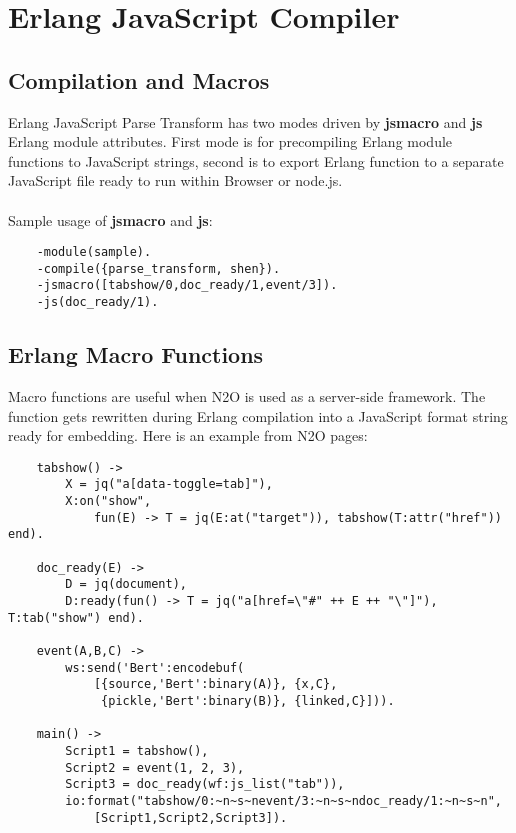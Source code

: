 \section{Erlang JavaScript Compiler}

\subsection{Compilation and Macros}
Erlang JavaScript Parse Transform has two modes driven
by {\bf \-jsmacro} and {\bf \-js} Erlang module attributes.
First mode is for precompiling Erlang module functions
to JavaScript strings, second is to export Erlang function
to a separate JavaScript file ready to run within Browser or node.js.

\paragraph{}
Sample usage of {\bf \-jsmacro} and {\bf \-js}:

\vspace{1\baselineskip}
\begin{lstlisting}
    -module(sample).
    -compile({parse_transform, shen}).
    -jsmacro([tabshow/0,doc_ready/1,event/3]).
    -js(doc_ready/1).
\end{lstlisting}

\subsection{Erlang Macro Functions}
Macro functions are useful when N2O is used as a server-side framework.
The function gets rewritten during Erlang compilation into a JavaScript format
string ready for embedding. Here is an example from N2O pages:

\begin{lstlisting}
    tabshow() ->
        X = jq("a[data-toggle=tab]"),
        X:on("show", 
            fun(E) -> T = jq(E:at("target")), tabshow(T:attr("href")) end).

    doc_ready(E) ->
        D = jq(document),
        D:ready(fun() -> T = jq("a[href=\"#" ++ E ++ "\"]"), T:tab("show") end).

    event(A,B,C) ->
        ws:send('Bert':encodebuf(
            [{source,'Bert':binary(A)}, {x,C},
             {pickle,'Bert':binary(B)}, {linked,C}])).

    main() ->
        Script1 = tabshow(),
        Script2 = event(1, 2, 3),
        Script3 = doc_ready(wf:js_list("tab")),
        io:format("tabshow/0:~n~s~nevent/3:~n~s~ndoc_ready/1:~n~s~n",
            [Script1,Script2,Script3]).
\end{lstlisting}
\vspace{1\baselineskip}

